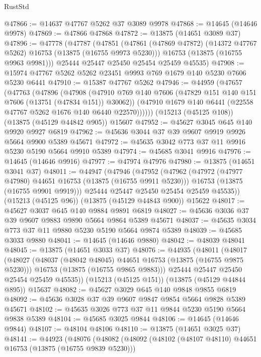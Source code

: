 \begin{lexlean}{RustStd}
\begin{coremodule}
@47866 := @14637 @47767 @5262 @37 @3089 @9978
@47868 := @14645 (@14646 @9978)
@47869 := @47866 @47868
@47872 := @13875 (@14651 @3089 @37)
@47896 := @47778
    (@47787
      (@47851
        (@47861 (@47869 @47872) (@14372 @47767 @5262) @16753 (@13875 (@16755 @9973 @5230)))
        @16753
        (@13875 (@16755 @9963 @9981)))
      @25444
      @25447
      @25450
      @25454
      @25459
      @45535)
@47908 := @15974 @47767 @5262 @5262 @23451 @9993 @769 @1679 @140 @5230 @7606 @5230 @6441
@47910 := @15387 @47767 @5262
@47946 := @44959
    (@47657
      (@47763
        (@47896
          (@47908
            (@47910 @769 @140 @7606 (@47829 @151 @140 @151 @7606 (@13751 (@47834 @151)) @30062))
            (@47910 @1679 @140 @6441 (@22558 @47767 @5262 @1676 @140 @6440 @22570))))))
    (@15213 (@45125 @108))
    (@13875 (@45129 @44842 @905))
    @15607
@47952 := @45627 @3045 @645 @140 @9920 @9927 @6819
@47962 := @45636 @3044 @37 @39 @9607 @9919 @9926 @5664 @9900 @5389 @45671
@47972 := @45635 @3042 @773 @37 @11 @9916 @5230 @5190 @5664 @9910 @5389
@47974 := @45685 @3041 @9916
@47976 := @14645 (@14646 @9916)
@47977 := @47974 @47976
@47980 := @13875 (@14651 @3041 @37)
@48011 := @44947
    (@47946
      (@47952
        (@47962
          (@47972 (@47977 @47980) @44651 @16753 (@13875 (@16755 @9911 @5230)))
          @16753
          (@13875 (@16755 @9901 @9919)))
        @25444
        @25447
        @25450
        @25454
        @25459
        @45535))
    (@15213 (@45125 @96))
    (@13875 (@45129 @44843 @900))
    @15622
@48017 := @45627 @3037 @645 @140 @9884 @9891 @6819
@48027 := @45636 @3036 @37 @39 @9607 @9883 @9890 @5664 @9864 @5389 @45671
@48037 := @45635 @3034 @773 @37 @11 @9880 @5230 @5190 @5664 @9874 @5389
@48039 := @45685 @3033 @9880
@48041 := @14645 (@14646 @9880)
@48042 := @48039 @48041
@48045 := @13875 (@14651 @3033 @37)
@48076 := @44935
    (@48011
      (@48017
        (@48027
          (@48037 (@48042 @48045) @44651 @16753 (@13875 (@16755 @9875 @5230)))
          @16753
          (@13875 (@16755 @9865 @9883)))
        @25444
        @25447
        @25450
        @25454
        @25459
        @45535))
    (@15213 (@45125 @151))
    (@13875 (@45129 @44844 @895))
    @15637
@48082 := @45627 @3029 @645 @140 @9848 @9855 @6819
@48092 := @45636 @3028 @37 @39 @9607 @9847 @9854 @5664 @9828 @5389 @45671
@48102 := @45635 @3026 @773 @37 @11 @9844 @5230 @5190 @5664 @9838 @5389
@48104 := @45685 @3025 @9844
@48106 := @14645 (@14646 @9844)
@48107 := @48104 @48106
@48110 := @13875 (@14651 @3025 @37)
@48141 := @44923
    (@48076
      (@48082
        (@48092
          (@48102 (@48107 @48110) @44651 @16753 (@13875 (@16755 @9839 @5230)))

\end{coremodule}
\end{lexlean}
